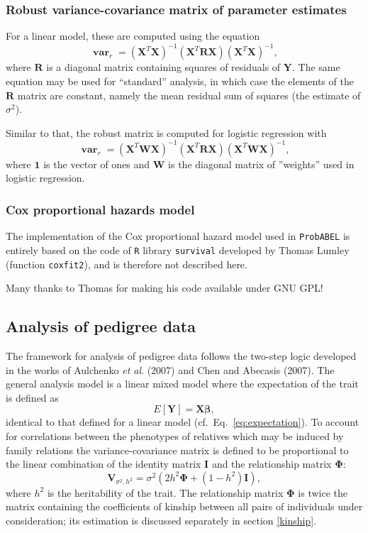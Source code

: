 \documentclass[12pt,a4paper]{article}
\DeclareMathOperator{\var}{\mathbf{var}}
\newcommand{\PA}{\texttt{ProbABEL}}
\begin{document}
\subsubsection{Robust variance-covariance matrix of parameter estimates}
For a linear model, these are computed using the equation
$$
\var_r = (\mathbf{X}^T\mathbf{X})^{-1} (\mathbf{X}^T\mathbf{R}\mathbf{X})
(\mathbf{X}^T\mathbf{X})^{-1},
$$
where $\mathbf{R}$ is a diagonal matrix containing squares of residuals
of $\mathbf{Y}$. The
same equation may be used for ``standard'' analysis, in which case
the elements of the $\mathbf{R}$ matrix are constant, namely the mean
residual sum of squares (the estimate of $\sigma^2$).

Similar to that, the robust matrix is computed for logistic regression with
$$
\var_r = (\mathbf{X}^T \mathbf{W} \mathbf{X})^{-1} (\mathbf{X}^T\mathbf{R}\mathbf{X})
(\mathbf{X}^T \mathbf{W} \mathbf{X})^{-1},
$$
where $\mathbf{1}$ is the vector of ones and $\mathbf{W}$ is the diagonal matrix
of ''weights'' used in logistic regression.


\subsubsection{Cox proportional hazards model}
The implementation of the Cox proportional hazard model used
in \PA{} is entirely based on the code of \texttt{R}
library \texttt{survival} developed by Thomas Lumley
(function \texttt{coxfit2}), and is therefore not described here.

Many thanks to Thomas for making his code available under GNU GPL!

\subsection{Analysis of pedigree data}
The framework for analysis of pedigree data follows the two-step logic
developed in the works of Aulchenko \emph{et al}. (2007) and Chen and
Abecasis (2007). The general analysis model is a linear mixed model
where the expectation of the trait is defined as
$$
E[\mathbf{Y}] = \mathbf{X} \mathbf{\beta},
$$
identical to that defined for a linear model
(cf.~Eq.~\ref{eq:expectation}). To account for correlations between
the phenotypes of relatives which may be induced by family relations
the variance-covariance matrix is defined to be proportional to the
linear combination of the identity matrix $\mathbf{I}$ and the
relationship matrix $\mathbf{\Phi}$:
$$
\mathbf{V}_{\sigma^2,h^2} = \sigma^2 \left( 2 h^2 \mathbf{\Phi} + (1-h^2)
\mathbf{I} \right),
$$
where $h^2$ is the heritability of the trait. The relationship matrix
$\mathbf{\Phi}$ is twice the matrix containing the coefficients of
kinship between all pairs of individuals under consideration; its
estimation is discussed separately in section \ref{kinship}.
\end{document}
